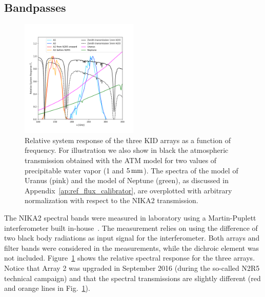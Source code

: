 \subsection{Bandpasses}
\label{se:instru_bandpass}

\begin{figure}[ht!] %
\begin{center}
\includegraphics[clip,trim={0, 1cm, 0, 2cm},width=0.5\textwidth]{Figures/bandpasses_nika2_colorsok.png}
\caption[NIKA2 transmission]{Relative system response of the three KID
  arrays as a
  function of frequency. For illustration we also show in black
  the atmospheric transmission obtained with the ATM model \citep{ATM,
    Pardo2001} for two values of precipitable water vapor (1 and
  $5\,\rm{mm}$).
  The spectra of the model of Uranus (pink) and the model of
  Neptune
  (green), as discussed in Appendix~\ref{ap:ref_flux_calibrator}, are overplotted with arbitrary
  normalization with respect to the NIKA2 transmission.} 
 \label{spectralband1}
\end{center}
\end{figure}

The NIKA2 spectral bands were measured in laboratory using a
Martin-Puplett interferometer built in-house~\citep{Durand2007_these}.
The measurement relies on using the difference of two black
body radiations as input signal for the interferometer. 
{\lp Both arrays and filter bands were considered in the
measurements, while the dichroic element was not included.}
Figure~\ref{spectralband1} shows the relative spectral response for
the three arrays. Notice that Array 2 was
upgraded in September 2016 (during the so-called N2R5 technical campaign) and that
the spectral transmissions are slightly different (red and orange lines in
Fig.~\ref{spectralband1}).

